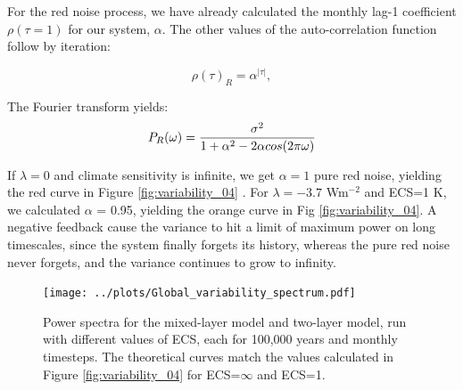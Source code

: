 \documentclass[12pt]{book}
\begin{document}
For the red noise process, we have already calculated the monthly lag-1 coefficient $\rho(\tau=1)$ for our system, $\alpha$. The other values of the auto-correlation function follow by iteration:

\begin{equation}
\rho(\tau)_R = \alpha^{ |  \tau | },
\label{eqn_autocorr_red}
\end{equation}

The Fourier transform yields:
\begin{equation}
P_{R}(\omega) = \frac{\sigma^2}{1+\alpha^2 - 2 \alpha cos(2 \pi \omega)}  \\
\end{equation}

If $\lambda=0$ and climate sensitivity is infinite, we get $\alpha=1$ pure red noise, yielding the red curve in Figure \ref{fig:variability_04} . For $\lambda=-3.7$ Wm$^{-2}$ and ECS=1 K, we calculated $\alpha$ = 0.95, yielding the orange curve in Fig \ref{fig:variability_04}. A negative feedback cause the variance to hit a limit of maximum power on long timescales, since the system finally forgets its history, whereas the pure red noise never forgets, and the variance continues to grow to infinity.
\begin{figure}
	\begin{center}
		\texttt{[image: ../plots/Global\_variability\_spectrum.pdf]}
	\end{center}
	\caption{Power spectra for the mixed-layer model and two-layer model, run with different values of ECS, each for 100,000 years and monthly timesteps. The theoretical curves match the values calculated in Figure \ref{fig:variability_04} for ECS=$\infty$ and ECS=1. } 
	\label{fig:spectrum_models}
\end{figure}
\end{document}
